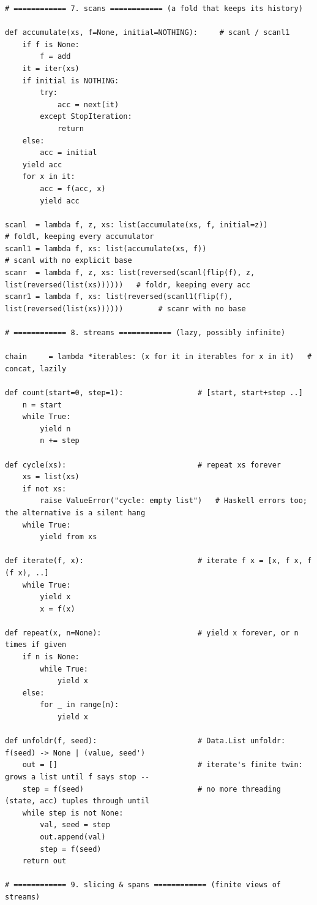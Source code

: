 \documentclass[10pt,letterpaper]{book}
\begin{document}
\begin{lstlisting}[style=file]
# ============ 7. scans ============ (a fold that keeps its history)

def accumulate(xs, f=None, initial=NOTHING):     # scanl / scanl1
    if f is None:
        f = add
    it = iter(xs)
    if initial is NOTHING:
        try:
            acc = next(it)
        except StopIteration:
            return
    else:
        acc = initial
    yield acc
    for x in it:
        acc = f(acc, x)
        yield acc

scanl  = lambda f, z, xs: list(accumulate(xs, f, initial=z))            # foldl, keeping every accumulator
scanl1 = lambda f, xs: list(accumulate(xs, f))                          # scanl with no explicit base
scanr  = lambda f, z, xs: list(reversed(scanl(flip(f), z, list(reversed(list(xs))))))   # foldr, keeping every acc
scanr1 = lambda f, xs: list(reversed(scanl1(flip(f), list(reversed(list(xs))))))        # scanr with no base

# ============ 8. streams ============ (lazy, possibly infinite)

chain     = lambda *iterables: (x for it in iterables for x in it)   # concat, lazily

def count(start=0, step=1):                 # [start, start+step ..]
    n = start
    while True:
        yield n
        n += step

def cycle(xs):                              # repeat xs forever
    xs = list(xs)
    if not xs:
        raise ValueError("cycle: empty list")   # Haskell errors too; the alternative is a silent hang
    while True:
        yield from xs

def iterate(f, x):                          # iterate f x = [x, f x, f (f x), ..]
    while True:
        yield x
        x = f(x)

def repeat(x, n=None):                      # yield x forever, or n times if given
    if n is None:
        while True:
            yield x
    else:
        for _ in range(n):
            yield x

def unfoldr(f, seed):                       # Data.List unfoldr: f(seed) -> None | (value, seed')
    out = []                                # iterate's finite twin: grows a list until f says stop --
    step = f(seed)                          # no more threading (state, acc) tuples through until
    while step is not None:
        val, seed = step
        out.append(val)
        step = f(seed)
    return out

# ============ 9. slicing & spans ============ (finite views of streams)


\end{lstlisting}
\end{document}
